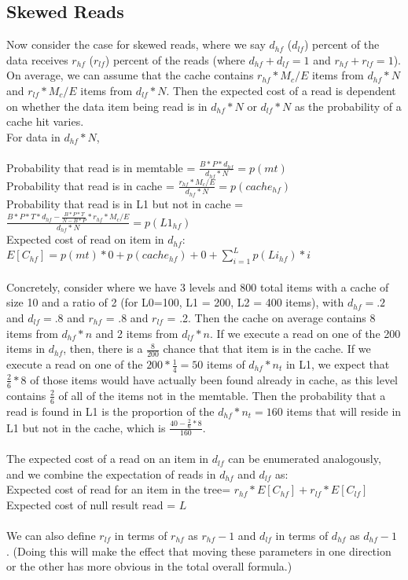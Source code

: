 \documentclass[11pt]{article}
\theoremstyle{plain}
\theoremstyle{definition}
\begin{document}
\subsection{Skewed Reads}

Now consider the case for skewed reads, where we say $d_{hf}$ ($d_{lf}$) percent of the data receives $r_{hf}$ ($r_{lf}$) percent of the reads (where $d_{hf} + d_{lf} = 1$ and $r_{hf} + r_{lf} = 1$). On average, we can assume that the cache contains $r_{hf} * M_c/E$ items from $d_{hf} * N$ and $r_{lf} * M_c/E$ items from $d_{lf} * N$. Then the expected cost of a read is dependent on whether the data item being read is in $d_{hf} * N$ or $d_{lf} * N$ as the probability of a cache hit varies.\\
For data in $d_{hf} * N$, \\ \\
Probability that read is in memtable = $\frac{B*P*d_{hf}}{d_{hf} *N}  = p(mt)$\\
Probability that read is in cache = $\frac{r_{hf} * M_c/E}{d_{hf} * N} = p(cache_{hf})$ \\
Probability that read is in L1 but not in cache = $ \frac{B*P * T*d_{hf} - \frac{B*P * T}{N-B*P} * r_{hf} * M_c/E}{d_{hf} * N}  = p(L1_{hf})$ \\
Expected cost of read on item in $d_{hf}$: $E[C_{hf}]= p(mt) * 0  + p(cache_{hf}) + 0 + \sum_{i=1}^L p(Li_{hf}) * i$\\ \\
Concretely, consider where we have 3 levels and 800 total items with a cache of size 10 and a ratio of 2  (for L0=100, L1 = 200, L2 = 400 items), with $d_{hf} = .2$ and $d_{lf} = .8$ and $r_{hf}$ = .8 and $r_{lf}$ = .2. Then the cache on average contains 8 items from $d_{hf} * n$ and 2 items from $d_{lf}*n$. If we execute a read on one of the 200 items in $d_{hf}$, then, there is a $\frac{8}{200}$ chance that that item is in the cache. If we execute a read on one of the $200*\frac{1}{4} = 50$ items of  $d_{hf} * n_t$ in L1, we expect that $\frac{2}{6} * 8$ of those items would have actually been found already in cache, as this level contains $\frac{2}{6}$ of all of the items not in the memtable. Then the probability that a read is found in L1 is the proportion of the $d_{hf} * n_t = 160$ items that will reside in L1 but not in the cache, which is $\frac{40 - \frac{2}{6} * 8}{160}$. \\ \\
The expected cost of a read on an item in $d_{lf}$ can be enumerated analogously, and we combine the expectation of reads in $d_{hf}$ and $d_{lf}$ as: \\
Expected cost of read for an item in the tree= $r_{hf} * E[C_{hf}] + r_{lf} * E[C_{lf}]$ \\
Expected cost of null result read = $L$ \\ \\
We can also define $r_{lf}$ in terms of $r_{hf}$ as $r_{hf} - 1$ and  $d_{lf}$ in terms of $d_{hf}$ as $d_{hf} - 1$ . (Doing this will make the effect that moving these parameters in one direction or the other has more obvious in the total overall formula.)
\end{document}
